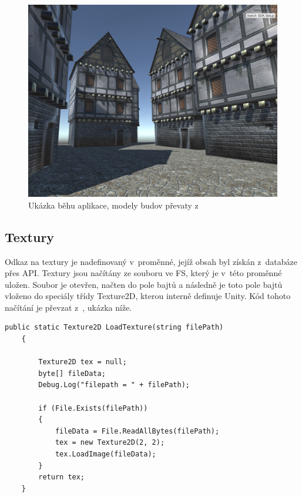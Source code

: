 \documentclass[thesis=B,czech]{FITthesis}[2012/06/26]
\begin{document}
\begin{figure}
  		\includegraphics[width=\textwidth,height=\textheight,keepaspectratio]{screen1.png}
  		\caption{Ukázka běhu aplikace, modely budov převaty z~\cite{building}}
  		\label{fig:buildings}
	\end{figure}
    
    
    \subsection{Textury}
    
    Odkaz na textury je nadefinovaný v~proměnné, jejíž obsah byl získán z~databáze přes API. Textury jsou načítány ze souboru ve FS, který je v~této proměnné uložen. Soubor je otevřen, načten do pole bajtů a následně je toto pole bajtů vloženo do speciály třídy Texture2D, kterou interně definuje Unity. Kód tohoto načítání je převzat z~\cite{unityFAQtext}, ukázka níže.

\begin{minipage}[c]{0.95\textwidth}
\begin{lstlisting}[frame=single]
  public static Texture2D LoadTexture(string filePath)
    {

        Texture2D tex = null;
        byte[] fileData;
        Debug.Log("filepath = " + filePath);

        if (File.Exists(filePath))
        {
            fileData = File.ReadAllBytes(filePath);
            tex = new Texture2D(2, 2);
            tex.LoadImage(fileData);
        }
        return tex;
    }
        \end{lstlisting}
        \end{minipage}	
        
\end{document}
